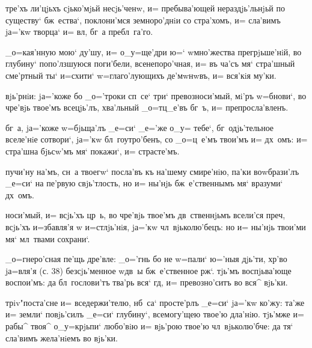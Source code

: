 

тре'хъ ли'цjьхъ сjько'мjьй несjь'ченw, и= пребыва'ющей 
нераздjь'льнjьй по существу` бж~ества`, поклони'мся 
земноро'днiи со стра'хомъ, и= сла'вимъ jа='кw творца` и= 
вл, бг~а пребл~га'го.

_о=кая'нную мою` ду'шу, и= о_у=ще'дри ю=` w\т мно'жества 
прегрjьше'нiй, во глубину` попо'лзшуюся поги'бели, 
всенепоро'чная, и= въ ча'съ мя` стра'шный сме'ртный ты` 
и=схити` w=глаго'лующихъ де'мwнwвъ, и= вся'кiя му'ки.


вjь'рнiи: jа='коже бо _о='троки сп~се` три` 
превозноси'мый, мi'ръ w=бнови`, во чре'вjь твое'мъ 
всецjь'лъ, хва'льный _о=тц_е'въ бг~ъ, и= препросла'вленъ.

бг~а, jа='коже w=бjьща'лъ _е=си` _е='же о_у= тебе`, 
бг~одjь'тельное вселе'нiе сотвори`, jа='кw 
бл~гоутро'бенъ, со _о=ц~е'мъ твои'мъ и= дх~омъ: и= 
стра'шна бjьсw'мъ мя` покажи`, и= страсте'мъ. 

пучи'ну на'мъ, сн~а твоегw` посла'въ къ на'шему 
смире'нiю, па'ки воwбрази'лъ _е=си` на пе'рвую 
свjь'тлость, но и= ны'нjь бж~е'ственнымъ мя` вразуми` 
дх~омъ.

носи'мый, и= всjь'хъ цр~ь, во чре'вjь твое'мъ 
дв~ственнjьмъ всели'ся преч, всjь'хъ и=збавля'я w\т 
и=стлjь'нiя, jа='кw чл~вjьколю'бецъ: но и= ны'нjь твои'ми 
мя` мл~твами сохрани`.


_о=гнеро'сная пе'щь дре'вле: _о='гнь бо не w=пали` ю='ныя 
дjь'ти, хр'во jа=вля'я (с. 38) безсjь'менное w\т дв~ы 
бж~е'ственное рж`. тjь'мъ воспjьва'юще воспои'мъ: да 
бл~гослови'тъ тва'рь вся` гд, и= превозно'ситъ во вся^ 
вjь'ки.

трiv"поста'сне и= вседержи'телю, нб~са` просте'рлъ _е=си` 
jа='кw ко'жу: та'же и= земли` повjь'силъ _е=си` глубину`, 
всемогу'щею твое'ю дла'нiю. тjь'мже и= рабы^ твоя^ 
о_у=крjьпи` любо'вiю и= вjь'рою твое'ю чл~вjьколю'бче: да 
тя` сла'вимъ жела'нiемъ во вjь'ки.

